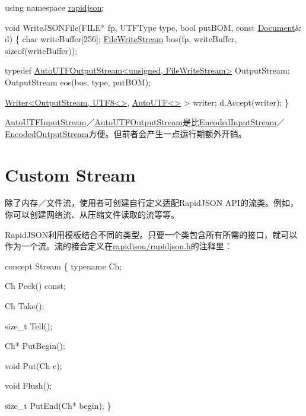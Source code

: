 \begin{DoxyCode}
\textcolor{keyword}{using namespace }\hyperlink{namespacerapidjson}{rapidjson};

\textcolor{keywordtype}{void} WriteJSONFile(FILE* fp, UTFType type, \textcolor{keywordtype}{bool} putBOM, \textcolor{keyword}{const} \hyperlink{class_generic_document}{Document}& d) \{
    \textcolor{keywordtype}{char} writeBuffer[256];
    \hyperlink{class_file_write_stream}{FileWriteStream} bos(fp, writeBuffer, \textcolor{keyword}{sizeof}(writeBuffer));

    \textcolor{keyword}{typedef} \hyperlink{class_auto_u_t_f_output_stream}{AutoUTFOutputStream<unsigned, FileWriteStream>} 
      OutputStream;
    OutputStream eos(bos, type, putBOM);

    \hyperlink{class_writer}{Writer<OutputStream, UTF8<>}, \hyperlink{struct_auto_u_t_f}{AutoUTF<>} > writer;
    d.Accept(writer);
\}
\end{DoxyCode}


{\ttfamily \hyperlink{class_auto_u_t_f_input_stream}{Auto\+U\+T\+F\+Input\+Stream}}／{\ttfamily \hyperlink{class_auto_u_t_f_output_stream}{Auto\+U\+T\+F\+Output\+Stream}}是比{\ttfamily \hyperlink{class_encoded_input_stream}{Encoded\+Input\+Stream}}／{\ttfamily \hyperlink{class_encoded_output_stream}{Encoded\+Output\+Stream}}方便。但前者会产生一点运行期额外开销。\hypertarget{md_Cadriciel_Commun_Externe_RapidJSON_doc_stream.zh-cn_CustomStream}{}\section{Custom Stream}\label{md_Cadriciel_Commun_Externe_RapidJSON_doc_stream.zh-cn_CustomStream}
除了内存／文件流，使用者可创建自行定义适配\+Rapid\+J\+S\+ON A\+P\+I的流类。例如，你可以创建网络流、从压缩文件读取的流等等。

Rapid\+J\+S\+O\+N利用模板结合不同的类型。只要一个类包含所有所需的接口，就可以作为一个流。流的接合定义在{\ttfamily \hyperlink{rapidjson_8h}{rapidjson/rapidjson.\+h}}的注释里：


\begin{DoxyCode}
concept Stream \{
    \textcolor{keyword}{typename} Ch;    

    Ch Peek() \textcolor{keyword}{const};

    Ch Take();

    \textcolor{keywordtype}{size\_t} Tell();

    Ch* PutBegin();

    \textcolor{keywordtype}{void} Put(Ch c);

    \textcolor{keywordtype}{void} Flush();

    \textcolor{keywordtype}{size\_t} PutEnd(Ch* begin);
\}
\end{DoxyCode}


